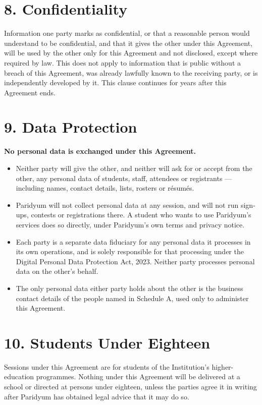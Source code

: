 \documentclass{paridyum}
\begin{document}
\section*{8. Confidentiality}
Information one party marks as confidential, or that a reasonable person would understand to be
confidential, and that it gives the other under this Agreement, will be used by the other only
for this Agreement and not disclosed, except where required by law. This does not apply to
information that is public without a breach of this Agreement, was already lawfully known to
the receiving party, or is independently developed by it. This clause continues for
\dkTConfidentialityYears{} years after this Agreement ends.

\section*{9. Data Protection}
\begin{infobox}
\textbf{No personal data is exchanged under this Agreement.}
\begin{itemize}[leftmargin=*, noitemsep]
    \item Neither party will give the other, and neither will ask for or accept from the other,
          any personal data of students, staff, attendees or registrants --- including names,
          contact details, lists, rosters or r\'esum\'es.
    \item Paridyum will not collect personal data at any session, and will not run sign-ups,
          contests or registrations there. A student who wants to use Paridyum's services does so
          directly, under Paridyum's own terms and privacy notice.
    \item Each party is a separate data fiduciary for any personal data it processes in its own
          operations, and is solely responsible for that processing under the Digital Personal
          Data Protection Act, 2023. Neither party processes personal data on the other's behalf.
    \item The only personal data either party holds about the other is the business contact
          details of the people named in Schedule A, used only to administer this Agreement.
\end{itemize}
\end{infobox}

\section*{10. Students Under Eighteen}
Sessions under this Agreement are for students of the Institution's higher-education
programmes. Nothing under this Agreement will be delivered at a school or directed at persons
under eighteen, unless the parties agree it in writing after Paridyum has obtained legal advice
that it may do so.
\end{document}
